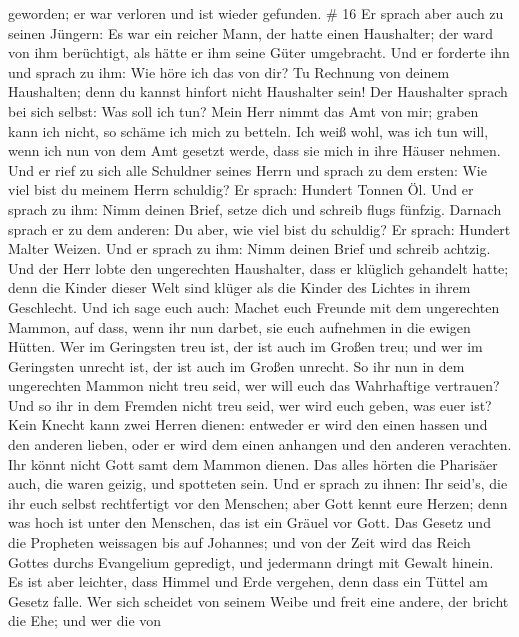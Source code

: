 geworden; er war verloren und ist wieder gefunden. \# 16  Er
sprach aber auch zu seinen Jüngern: Es war ein reicher Mann, der hatte
einen Haushalter; der ward von ihm berüchtigt, als hätte er ihm seine
Güter umgebracht.  Und er forderte ihn und sprach zu ihm:
Wie höre ich das von dir? Tu Rechnung von deinem Haushalten; denn du
kannst hinfort nicht Haushalter sein!  Der Haushalter sprach
bei sich selbst: Was soll ich tun? Mein Herr nimmt das Amt von mir;
graben kann ich nicht, so schäme ich mich zu betteln.  Ich
weiß wohl, was ich tun will, wenn ich nun von dem Amt gesetzt werde,
dass sie mich in ihre Häuser nehmen.  Und er rief zu sich
alle Schuldner seines Herrn und sprach zu dem ersten: Wie viel bist du
meinem Herrn schuldig?  Er sprach: Hundert Tonnen Öl. Und er
sprach zu ihm: Nimm deinen Brief, setze dich und schreib flugs fünfzig.
 Darnach sprach er zu dem anderen: Du aber, wie viel bist du
schuldig? Er sprach: Hundert Malter Weizen. Und er sprach zu ihm: Nimm
deinen Brief und schreib achtzig.  Und der Herr lobte den
ungerechten Haushalter, dass er klüglich gehandelt hatte; denn die
Kinder dieser Welt sind klüger als die Kinder des Lichtes in ihrem
Geschlecht.  Und ich sage euch auch: Machet euch Freunde mit
dem ungerechten Mammon, auf dass, wenn ihr nun darbet, sie euch
aufnehmen in die ewigen Hütten.  Wer im Geringsten treu
ist, der ist auch im Großen treu; und wer im Geringsten unrecht ist, der
ist auch im Großen unrecht.  So ihr nun in dem ungerechten
Mammon nicht treu seid, wer will euch das Wahrhaftige vertrauen?
 Und so ihr in dem Fremden nicht treu seid, wer wird euch
geben, was euer ist?  Kein Knecht kann zwei Herren dienen:
entweder er wird den einen hassen und den anderen lieben, oder er wird
dem einen anhangen und den anderen verachten. Ihr könnt nicht Gott samt
dem Mammon dienen.  Das alles hörten die Pharisäer auch,
die waren geizig, und spotteten sein.  Und er sprach zu
ihnen: Ihr seid's, die ihr euch selbst rechtfertigt vor den Menschen;
aber Gott kennt eure Herzen; denn was hoch ist unter den Menschen, das
ist ein Gräuel vor Gott.  Das Gesetz und die Propheten
weissagen bis auf Johannes; und von der Zeit wird das Reich Gottes
durchs Evangelium gepredigt, und jedermann dringt mit Gewalt hinein.
 Es ist aber leichter, dass Himmel und Erde vergehen, denn
dass ein Tüttel am Gesetz falle.  Wer sich scheidet von
seinem Weibe und freit eine andere, der bricht die Ehe; und wer die von
